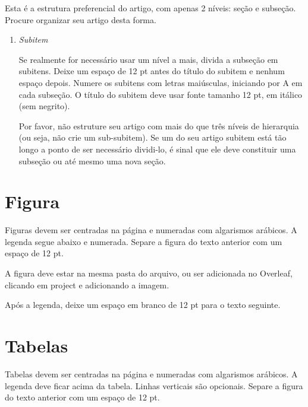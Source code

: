 \documentclass[
	article,			%
	12pt,				%
	oneside,			%
	a4paper,			%
	english,			%
	brazil,				%
	sumario=tradicional
	]{abntex2}
\begin{document}
Esta é a estrutura preferencial do artigo, com apenas 2 níveis: seção e subseção.  Procure organizar seu artigo desta forma.

\begin{enumerate}[label=\Alph*]
\item \textit{Subitem}

Se realmente for necessário usar um nível a mais, divida a subseção em subitens.  Deixe um espaço de 12 pt antes do título do subitem e nenhum espaço depois.  Numere os subitens com letras maiúsculas, iniciando por A em cada subseção.   O título do subitem deve usar fonte tamanho 12 pt, em itálico (sem negrito).

Por favor, não estruture seu artigo com mais do que três níveis de hierarquia (ou seja, não crie um sub-subitem).  Se um do seu artigo subitem está tão longo a ponto de ser necessário dividi-lo, é sinal que ele deve constituir uma subseção ou até mesmo uma nova seção.

\end{enumerate}

\section{Figura}

Figuras devem ser centradas na página e numeradas com algarismos arábicos.  A legenda segue abaixo e numerada. Separe a figura do texto anterior com um espaço de 12 pt. 

A figura deve estar na mesma pasta do arquivo, ou ser adicionada no Overleaf, clicando em project e adicionando a imagem.


Após a legenda, deixe um espaço em branco de 12 pt para o texto seguinte.

\section{Tabelas}

Tabelas devem ser centradas na página e numeradas com algarismos arábicos.  A legenda deve ficar acima da tabela.   Linhas verticais são opcionais.  Separe a figura do texto anterior com um espaço de 12 pt. 
\end{document}
